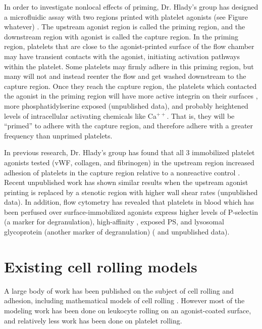 In order to investigate nonlocal effects of priming, Dr. Hlady's group
has designed a microfluidic assay with two regions printed with
platelet agonists (see Figure whatever) \cite{Corum2012}. The upstream
agonist region is called the priming region, and the downstream region
with agonist is called the capture region. In the priming region,
platelets that are close to the agonist-printed surface of the flow
chamber may have transient contacts with the agonist, initiating
activation pathways within the platelet. Some platelets may firmly
adhere in this priming region, but many will not and instead reenter
the flow and get washed downstream to the capture region. Once they
reach the capture region, the platelets which contacted the agonist in
the priming region will have more active integrin on their surfaces
\cite{Corum2012}, more phosphatidylserine exposed (unpublished data),
and probably heightened levels of intracellular activating chemicals
like Ca$^{++}$. That is, they will be ``primed'' to adhere with the
capture region, and therefore adhere with a greater frequency than
unprimed platelets.

In previous research, Dr. Hlady's group has found that all 3
immobilized platelet agonists tested (vWF, collagen, and fibrinogen)
in the upstream region increased adhesion of platelets in the capture
region relative to a nonreactive control
\cite{Corum2012,Eichinger2016}. Recent unpublished work has shown
similar results when the upstream agonist printing is replaced by a
stenotic region with higher wall shear rates (unpublished data). In
addition, flow cytometry has revealed that platelets in blood which
has been perfused over surface-immobilized agonists express higher
levels of P-selectin (a marker for degranulation), high-affinity
, exposed PS, and lysosomal glycoprotein (another
marker of degranulation) (\cite{Corum2012,Eichinger2016} and
unpublished data).

\section{Existing cell rolling models}
\label{sec:exist-cell-roll}

A large body of work has been published on the subject of cell rolling
and adhesion, including mathematical models of cell rolling
\cite{Pospieszalska2009,Sundd2011}. However most of the modeling work
has been done on leukocyte rolling on an agonist-coated surface, and
relatively less work has been done on platelet rolling.

